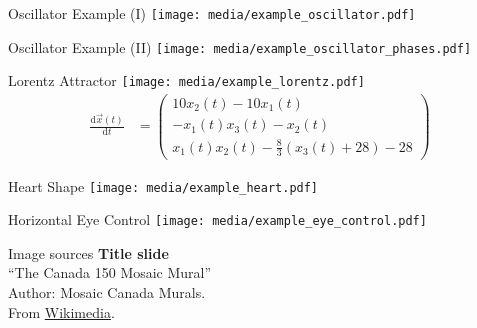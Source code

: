 \documentclass[handout,aspectratio=169]{beamer}
\begin{document}
	\begin{frame}{Oscillator Example (I)}
		\centering
		\texttt{[image: media/example\_oscillator.pdf]}
	\end{frame}

	\begin{frame}{Oscillator Example (II)}
		\centering
		\texttt{[image: media/example\_oscillator\_phases.pdf]}
	\end{frame}

	\begin{frame}{Lorentz Attractor}
		\centering
		\texttt{[image: media/example\_lorentz.pdf]}
		\begin{align*}
			\frac{\mathrm{d}\vec x(t)}{\mathrm{d}t} &= \begin{pmatrix}
			10 x_2(t)-10x_1(t) \\
			-x_1(t) x_3(t)-x_2(t) \\
			x_1(t) x_2(t) - \frac{8}{3}(x_3(t)+28)-28
			\end{pmatrix}
		\end{align*}
	\end{frame}

	\begin{frame}{Heart Shape}
		\centering
		\texttt{[image: media/example\_heart.pdf]}
	\end{frame}

	\begin{frame}{Horizontal Eye Control}
		\centering
		\texttt{[image: media/example\_eye\_control.pdf]}
	\end{frame}

	\backupbegin

	\begin{frame}[noframenumbering]{Image sources}
		\small
		\textbf{Title slide}\\\enquote{The Canada 150 Mosaic Mural}\\Author: Mosaic Canada Murals.\\From \href{https://commons.wikimedia.org/wiki/File:Canada_150_Mosaic_Engine.jpg}{Wikimedia}.
	\end{frame}


	\backupend
	
\end{document}

